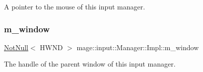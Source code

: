 A pointer to the mouse of this input manager. \hypertarget{classmage_1_1input_1_1_manager_1_1_impl_afd49b4b35e1c1f93084d5cf31b89fe80}{}\label{classmage_1_1input_1_1_manager_1_1_impl_afd49b4b35e1c1f93084d5cf31b89fe80} 
\subsubsection{\texorpdfstring{m\+\_\+window}{m\_window}}
{\footnotesize\ttfamily \hyperlink{namespacemage_a8769f9d670d6b585ea306cb1062af94b}{Not\+Null}$<$ H\+W\+ND $>$ mage\+::input\+::\+Manager\+::\+Impl\+::m\+\_\+window\hspace{0.3cm}{\ttfamily [private]}}

The handle of the parent window of this input manager. 